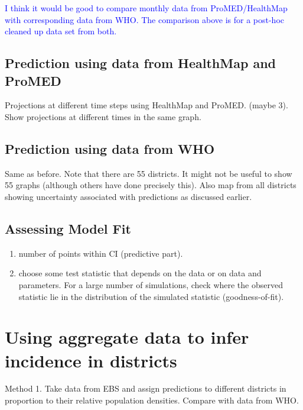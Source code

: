 \documentclass[a4paper,12pt]{article}
\def\sb#1{\textcolor{blue}{#1}}
\begin{document}
  \sb{I think it would be good to compare monthly data from
   ProMED/HealthMap with corresponding data from WHO. The comparison
   above is for a post-hoc cleaned up data set from both.} 

 \subsection{Prediction using data from HealthMap and ProMED}
 Projections at different time steps using HealthMap and
 ProMED. (maybe 3).
 Show projections at different times in the same graph.

 \subsection{Prediction using data from WHO}
 Same as before. Note that there are 55 districts. It might not be
 useful to show 55 graphs (although others have done precisely this). 
 Also map from all districts showing uncertainty
 associated with predictions as discussed earlier.

 \subsection{Assessing Model Fit}
 \begin{enumerate}
 \item number of points within CI (predictive part).
 \item choose some test statistic that depends on the data or on data
   and parameters. For a large number of simulations, check where the
   observed statistic lie in the distribution of the simulated statistic (goodness-of-fit).
 \end{enumerate}
 
 \section{Using aggregate data to infer incidence in districts}

 Method 1. Take data from EBS and assign predictions to different
 districts in proportion to their relative population densities.
 Compare with data from WHO.
\end{document}
